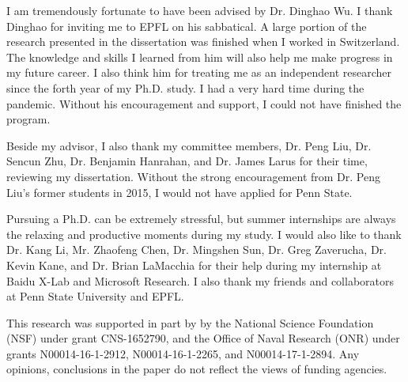 I am tremendously fortunate to have been advised by Dr. Dinghao Wu.  I thank Dinghao for inviting me to EPFL on his sabbatical. A large portion of the research presented in the dissertation was finished when I worked in Switzerland. The knowledge and skills I learned from him will also help me make progress in my future career. I also think him for treating me as an independent researcher since the forth year of my Ph.D. study. I had a very hard time during the pandemic. Without his encouragement and support, I could not have finished the program.

Beside my advisor, I also thank my committee members, Dr. Peng Liu, Dr. Sencun Zhu, Dr. Benjamin Hanrahan, and Dr. James Larus for their time, reviewing my dissertation. Without the strong encouragement from Dr. Peng Liu's former students in 2015, I would not have applied for Penn State.

Pursuing a Ph.D. can be extremely stressful, but summer internships are always the relaxing and productive moments during my study. I would also like to thank Dr. Kang Li, Mr. Zhaofeng Chen, Dr. Mingshen Sun, Dr. Greg Zaverucha, Dr. Kevin Kane, and Dr. Brian LaMacchia for their help during my internship at Baidu X-Lab and Microsoft Research.  I also thank my friends and collaborators at Penn State University and EPFL. 

This research was supported in part by by the National Science Foundation (NSF) under grant CNS-1652790, and the Office of Naval Research (ONR) under grants N00014-16-1-2912, N00014-16-1-2265, and N00014-17-1-2894. Any opinions, conclusions in the paper do not reflect the views of funding agencies.

